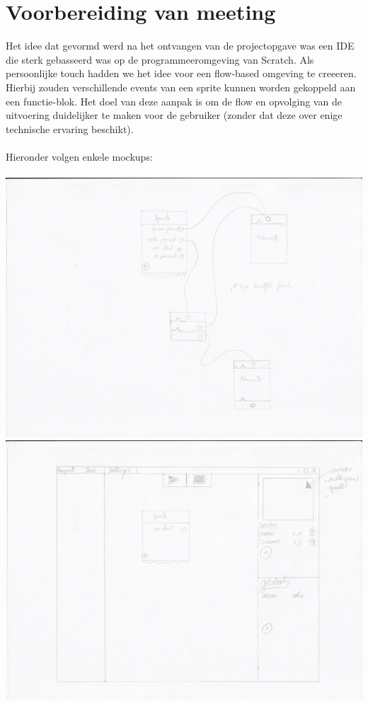 \documentclass[]{article}
\begin{document}
\section{Voorbereiding van meeting}
Het idee dat gevormd werd na het ontvangen van de projectopgave was een IDE die sterk gebasseerd was op de programmeeromgeving van Scratch. Als persoonlijke touch hadden we het idee voor een flow-based omgeving te creeeren. Hierbij zouden verschillende events van een sprite kunnen worden gekoppeld aan een functie-blok. Het doel van deze aanpak is om de flow en opvolging van de uitvoering duidelijker te maken voor de gebruiker (zonder dat deze over enige technische ervaring beschikt). \\\\
Hieronder volgen enkele mockups:\\\\
\includegraphics[scale=0.10]{mockup1-1.jpg}
\includegraphics[scale=0.10]{mockup1-2.jpg}
\end{document}
